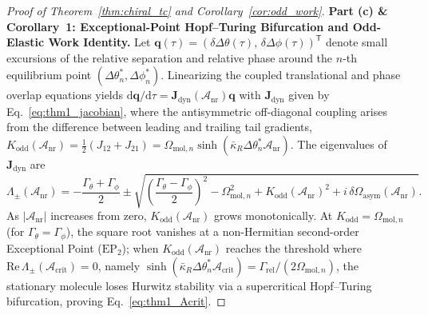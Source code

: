 \documentclass[11pt,letterpaper]{article}
\begin{document}
\begin{proof}[Proof of Theorem~\ref{thm:chiral_tc} and Corollary~\ref{cor:odd_work}]
\textbf{Part (c) \& Corollary~1: Exceptional-Point Hopf--Turing Bifurcation and Odd-Elastic Work Identity.}
Let $\mathbf{q}(\tau) = (\delta\Delta\theta(\tau),\,\delta\Delta\phi(\tau))^{\mathsf{T}}$ denote small excursions of the relative separation and relative phase around the $n$-th equilibrium point $(\Delta\theta_n^*, \Delta\phi_n^*)$. Linearizing the coupled translational and phase overlap equations yields $\mathrm{d}\mathbf{q}/\mathrm{d}\tau = \mathbf{J}_{\mathrm{dyn}}(\mathcal{A}_{\mathrm{nr}})\mathbf{q}$ with $\mathbf{J}_{\mathrm{dyn}}$ given by Eq.~\eqref{eq:thm1_jacobian}, where the antisymmetric off-diagonal coupling arises from the difference between leading and trailing tail gradients, $K_{\mathrm{odd}}(\mathcal{A}_{\mathrm{nr}}) = \frac{1}{2}(J_{12} + J_{21}) = \Omega_{\mathrm{mol},n}\sinh(\bar{\kappa}_R\Delta\theta_n^* \mathcal{A}_{\mathrm{nr}})$. The eigenvalues of $\mathbf{J}_{\mathrm{dyn}}$ are
\begin{equation}
\Lambda_\pm(\mathcal{A}_{\mathrm{nr}}) = -\frac{\Gamma_\theta + \Gamma_\phi}{2} \pm \sqrt{\left(\frac{\Gamma_\theta - \Gamma_\phi}{2}\right)^2 - \Omega_{\mathrm{mol},n}^2 + K_{\mathrm{odd}}(\mathcal{A}_{\mathrm{nr}})^2 + i\,\delta\Omega_{\mathrm{asym}}(\mathcal{A}_{\mathrm{nr}})}.
\label{eq:appA_eigenvalues}
\end{equation}
As $|\mathcal{A}_{\mathrm{nr}}|$ increases from zero, $K_{\mathrm{odd}}(\mathcal{A}_{\mathrm{nr}})$ grows monotonically. At $K_{\mathrm{odd}} = \Omega_{\mathrm{mol},n}$ (for $\Gamma_\theta = \Gamma_\phi$), the square root vanishes at a non-Hermitian second-order Exceptional Point ($\mathrm{EP}_2$); when $K_{\mathrm{odd}}(\mathcal{A}_{\mathrm{nr}})$ reaches the threshold where $\mathrm{Re}\,\Lambda_\pm(\mathcal{A}_{\mathrm{crit}}) = 0$, namely $\sinh(\bar{\kappa}_R\Delta\theta_n^*\mathcal{A}_{\mathrm{crit}}) = \Gamma_{\mathrm{rel}}/(2\Omega_{\mathrm{mol},n})$, the stationary molecule loses Hurwitz stability via a supercritical Hopf--Turing bifurcation, proving Eq.~\eqref{eq:thm1_Acrit}.


\end{proof}
\end{document}

